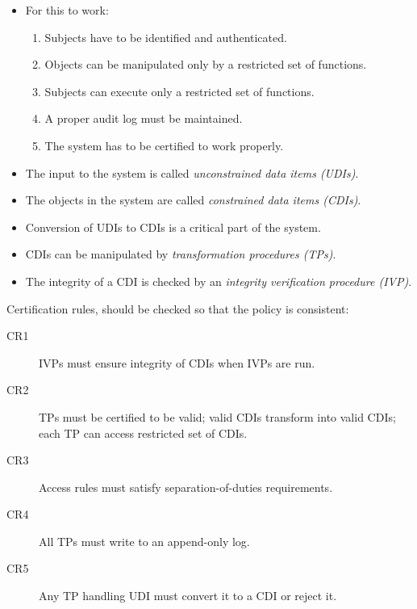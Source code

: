 \documentclass{beamer}
\begin{document}
\begin{frame}{\insertsubsectionhead}
  \begin{itemize}
    \item For this to work:
      \begin{enumerate}
        \item Subjects have to be identified and authenticated.
        \item Objects can be manipulated only by a restricted set of functions.
        \item Subjects can execute only a restricted set of functions.
        \item A proper audit log must be maintained.
        \item The system has to be certified to work properly.
      \end{enumerate}
  \end{itemize}
\end{frame}

\begin{frame}{\insertsubsectionhead}
  \begin{itemize}
    \item The input to the system is called \emph{unconstrained data items 
      (UDIs)}.

    \item The objects in the system are called \emph{constrained data items 
      (CDIs)}.

    \item Conversion of UDIs to CDIs is a critical part of the system.

    \item CDIs can be manipulated by \emph{transformation procedures (TPs)}.

    \item The integrity of a CDI is checked by an \emph{integrity verification 
      procedure (IVP)}.

  \end{itemize}
\end{frame}

\begin{frame}{\insertsubsectionhead}
  Certification rules, should be checked so that the policy is consistent:
  \begin{description}
    \item[CR1] IVPs must ensure integrity of CDIs when IVPs are run.
    \item[CR2] TPs must be certified to be valid; valid CDIs transform into 
      valid CDIs; each TP can access restricted set of CDIs.
    \item[CR3] Access rules must satisfy separation-of-duties requirements.
    \item[CR4] All TPs must write to an append-only log.
    \item[CR5] Any TP handling UDI must convert it to a CDI or reject it.
  \end{description}
\end{frame}
\end{document}
